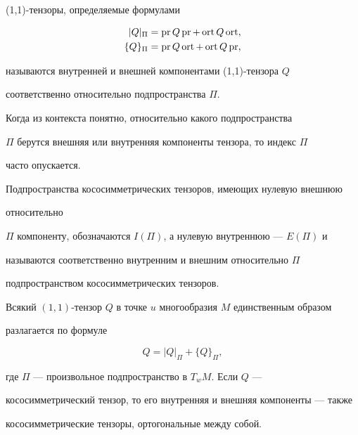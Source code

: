 \begin{defns}


(1,1)-тензоры, определяемые формулами


\begin{align}


|Q|_\Pi &=\pr Q \pr +\ort Q\ort,\\


\{ Q\} _\Pi &=\pr Q\ort +\ort Q\pr ,


\end{align}


называются внутренней и внешней компонентами (1,1)-тензора $Q$


соответственно относительно подпространства $\Pi$.


\end{defns}





Когда из контекста понятно, относительно какого подпространства


$\Pi$ берутся внешняя или внутренняя компоненты тензора, то индекс $\Pi$


часто опускается.





\begin{defns}


Подпространства кососимметрических тензоров, имеющих нулевую внешнюю


относительно


$\Pi$ компоненту, обозначаются $I(\Pi)$, а нулевую внутреннюю --- $E(\Pi)$ и


называются соответственно внутренним и внешним относительно $\Pi$


подпространством кососимметрических тензоров.


\end{defns}





\begin{props}


Всякий $(1,1)$-тензор $Q$ в точке $u$ многообразия $M$ единственным образом


разлагается по формуле


\begin{equation}


Q=|Q|_\Pi +\{ Q\} _\Pi,


\end{equation}


где $\Pi$ --- произвольное подпространство в $T_wM$. Если $Q$ ---


кососимметрический тензор, то его внутренняя и внешняя компоненты --- также


кососимметрические тензоры, ортогональные между собой.


\end{props}





